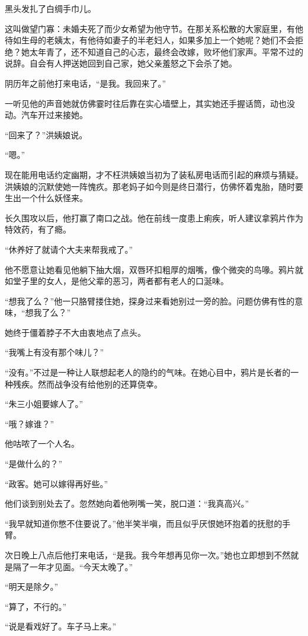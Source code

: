 \par 黑头发扎了白绸手巾儿。
\par 这叫做望门寡：未婚夫死了而少女希望为他守节。在那关系松散的大家庭里，有他待如生母的老姨太，有他待如妻子的半老妇人，如果多加上一个她呢？她们不会拒绝？她太年青了，还不知道自己的心志，最终会改嫁，败坏他们家声。平常不过的说辞。自会有人押送她回到自己家，她父亲羞怒之下会杀了她。
\par 阴历年之前他打来电话，“是我。我回来了。”
\par 一听见他的声音她就仿佛霎时往后靠在实心墙壁上，其实她还手握话筒，动也没动。汽车开过来接她。
\par “回来了？”洪姨娘说。
\par “嗯。”
\par 现在能用电话约定幽期，才不枉洪姨娘当初为了装私房电话而引起的麻烦与猜疑。洪姨娘的沉默使她一阵愧疚。那老妈子如今则是终日潜行，仿佛怀着鬼胎，随时要生出一个什么妖怪来。
\par 长久围攻以后，他打赢了南口之战。他在前线一度患上痢疾，听人建议拿鸦片作为特效药，有了瘾。
\par “休养好了就请个大夫来帮我戒了。”
\par 他不愿意让她看见他躺下抽大烟，双唇环扣粗厚的烟嘴，像个微突的鸟喙。鸦片就如堂子里的女人，是他父辈的恶习，两者都有老人的口涎味。
\par “想我了么？”他一只胳臂搂住她，探身过来看她别过一旁的脸。问题仿佛有性的意味，“想我了么？”
\par 她终于僵着脖子不大由衷地点了点头。
\par “我嘴上有没有那个味儿？”
\par “没有。”不过是一种让人联想起老人的隐约的气味。在她心目中，鸦片是长者的一种残疾。然而战争没有给他别的还算侥幸。
\par “朱三小姐要嫁人了。”
\par “哦？嫁谁？”
\par 他咕哝了一个人名。
\par “是做什么的？”
\par “政客。她可以嫁得再好些。”
\par 他们谈到别处去了。忽然她向着他咧嘴一笑，脱口道：“我真高兴。”
\par “我早就知道你憋不住要说了。”他半笑半嗔，而且似乎厌恨她环抱着的抚慰的手臂。
\par 次日晚上八点后他打来电话，“是我。我今年想再见你一次。”她也立即想到不然就是隔了一年才见面。“今天太晚了。”
\par “明天是除夕。”
\par “算了，不行的。”
\par “说是看戏好了。车子马上来。”
